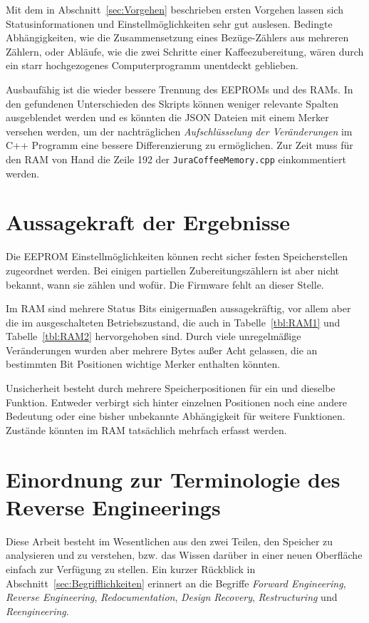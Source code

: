 Mit dem in Abschnitt~\ref{sec:Vorgehen} beschrieben ersten Vorgehen lassen sich Statusinformationen und Einstellmöglichkeiten sehr gut auslesen.
Bedingte Abhängigkeiten, wie die Zusammensetzung eines Bezüge-Zählers aus mehreren Zählern, oder Abläufe, wie die zwei Schritte einer Kaffeezubereitung, wären durch ein starr hochgezogenes Computerprogramm unentdeckt geblieben.

Ausbaufähig ist die wieder bessere Trennung des \ac{EEPROM}s und des \ac{RAM}s.
In den gefundenen Unterschieden des Skripts können weniger relevante Spalten ausgeblendet werden und es könnten die \ac{JSON} Dateien mit einem Merker versehen werden, um der nachträglichen \textit{Aufschlüsselung der Veränderungen} im C++ Programm eine bessere Differenzierung zu ermöglichen.
Zur Zeit muss für den \ac{RAM} von Hand die Zeile 192 der \texttt{JuraCoffeeMemory.cpp} einkommentiert werden.

\section{Aussagekraft der Ergebnisse}\label{sec:AussagekraftDerErgebnisse}
Die \ac{EEPROM} Einstellmöglichkeiten können recht sicher festen Speicherstellen zugeordnet werden.
Bei einigen partiellen Zubereitungszählern ist aber nicht bekannt, wann sie zählen und wofür.
Die Firmware fehlt an dieser Stelle.

Im \ac{RAM} sind mehrere Status Bits einigermaßen aussagekräftig, vor allem aber die im ausgeschalteten Betriebszustand, die auch in Tabelle~\ref{tbl:RAM1} und Tabelle~\ref{tbl:RAM2} hervorgehoben sind.
Durch viele unregelmäßige Veränderungen wurden aber mehrere Bytes außer Acht gelassen, die an bestimmten Bit Positionen wichtige Merker enthalten könnten.

Unsicherheit besteht durch mehrere Speicherpositionen für ein und dieselbe Funktion.
Entweder verbirgt sich hinter einzelnen Positionen noch eine andere Bedeutung oder eine bisher unbekannte Abhängigkeit für weitere Funktionen.
Zustände könnten im \ac{RAM} tatsächlich mehrfach erfasst werden.

\section{Einordnung zur Terminologie des Reverse Engineerings}\label{sec:DiskussionBegriffReverseEngineering}
Diese Arbeit besteht im Wesentlichen aus den zwei Teilen, den Speicher zu analysieren und zu verstehen, bzw. das Wissen darüber in einer neuen Oberfläche einfach zur Verfügung zu stellen.
Ein kurzer Rückblick in Abschnitt~\ref{sec:Begrifflichkeiten} erinnert an die Begriffe \textit{Forward Engineering}, \textit{Reverse Engineering}, \textit{Redocumentation}, \textit{Design Recovery}, \textit{Restructuring} und \textit{Reengineering}.

